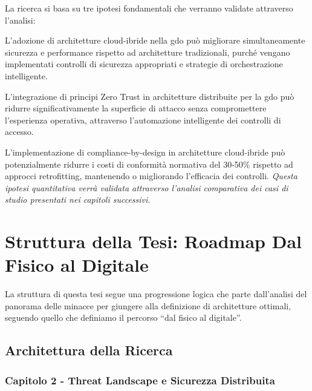 La ricerca si basa su tre ipotesi fondamentali che verranno validate attraverso l'analisi:

\begin{hypothesis}
L'adozione di architetture cloud-ibride nella \gls{gdo} può migliorare simultaneamente sicurezza e performance rispetto ad architetture tradizionali, purché vengano implementati controlli di sicurezza appropriati e strategie di orchestrazione intelligente.
\label{hyp:cloud-ibride}
\end{hypothesis}

\begin{hypothesis}
L'integrazione di principi Zero Trust in architetture distribuite per la \gls{gdo} può ridurre significativamente la superficie di attacco senza compromettere l'esperienza operativa, attraverso l'automazione intelligente dei controlli di accesso.
\label{hyp:zero-trust}
\end{hypothesis}

\begin{hypothesis}
L'implementazione di compliance-by-design in architetture cloud-ibride può potenzialmente ridurre i costi di conformità normativa del 30-50\% rispetto ad approcci retrofitting, mantenendo o migliorando l'efficacia dei controlli. \textit{Questa ipotesi quantitativa verrà validata attraverso l'analisi comparativa dei casi di studio presentati nei capitoli successivi.}
\label{hyp:compliance-by-design}
\end{hypothesis}

\section{Struttura della Tesi: Roadmap Dal Fisico al Digitale}
\label{sec:struttura-tesi}

La struttura di questa tesi segue una progressione logica che parte dall'analisi del panorama delle minacce per giungere alla definizione di architetture ottimali, seguendo quello che definiamo il percorso ``dal fisico al digitale''.

\subsection{Architettura della Ricerca}
\label{subsec:architettura-ricerca}

\subsubsection{Capitolo 2 - Threat Landscape e Sicurezza Distribuita}


